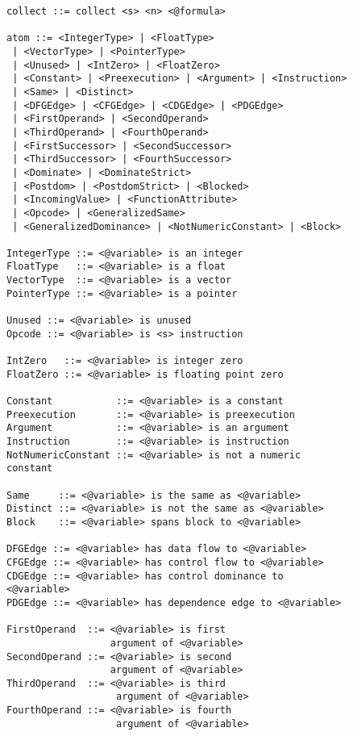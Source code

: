 \begin{figure}[p]
\begin{lstlisting}[language=BNF,basicstyle=\linespread{0.8}\ttfamily,
                   firstnumber=36]
collect ::= collect <s> <n> <@formula>

atom ::= <IntegerType> | <FloatType>
 | <VectorType> | <PointerType>
 | <Unused> | <IntZero> | <FloatZero>
 | <Constant> | <Preexecution> | <Argument> | <Instruction>
 | <Same> | <Distinct>
 | <DFGEdge> | <CFGEdge> | <CDGEdge> | <PDGEdge>
 | <FirstOperand> | <SecondOperand>
 | <ThirdOperand> | <FourthOperand>
 | <FirstSuccessor> | <SecondSuccessor>
 | <ThirdSuccessor> | <FourthSuccessor>
 | <Dominate> | <DominateStrict>
 | <Postdom> | <PostdomStrict> | <Blocked>
 | <IncomingValue> | <FunctionAttribute>
 | <Opcode> | <GeneralizedSame>
 | <GeneralizedDominance> | <NotNumericConstant> | <Block>

IntegerType ::= <@variable> is an integer
FloatType   ::= <@variable> is a float
VectorType  ::= <@variable> is a vector
PointerType ::= <@variable> is a pointer

Unused ::= <@variable> is unused
Opcode ::= <@variable> is <s> instruction

IntZero   ::= <@variable> is integer zero
FloatZero ::= <@variable> is floating point zero

Constant           ::= <@variable> is a constant
Preexecution       ::= <@variable> is preexecution
Argument           ::= <@variable> is an argument
Instruction        ::= <@variable> is instruction
NotNumericConstant ::= <@variable> is not a numeric constant

Same     ::= <@variable> is the same as <@variable>
Distinct ::= <@variable> is not the same as <@variable>
Block    ::= <@variable> spans block to <@variable>

DFGEdge ::= <@variable> has data flow to <@variable>
CFGEdge ::= <@variable> has control flow to <@variable>
CDGEdge ::= <@variable> has control dominance to <@variable>
PDGEdge ::= <@variable> has dependence edge to <@variable>

FirstOperand  ::= <@variable> is first
                  argument of <@variable>
SecondOperand ::= <@variable> is second
                  argument of <@variable>
ThirdOperand  ::= <@variable> is third
                   argument of <@variable>
FourthOperand ::= <@variable> is fourth
                   argument of <@variable>
\end{lstlisting}
\end{figure}

